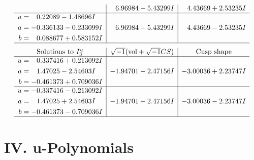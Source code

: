 \documentclass[1p]{elsarticle_modified}
\theoremstyle{definition}
\newcommand{\I}{\sqrt{-1}}
\begin{document}
$$\begin{array}{c|c|c}
 & \phantom{-}6.96984 - 5.43299 I & \phantom{-}4.43669 + 2.53235 I \\ \hline\begin{aligned}
u &= \phantom{-}0.22089 - 1.48696 I \\
a &= -0.336133 - 0.233099 I \\
b &= \phantom{-}0.088677 + 0.583152 I\end{aligned}
 & \phantom{-}6.96984 + 5.43299 I & \phantom{-}4.43669 - 2.53235 I\\
 \hline 
 \end{array}$$\newpage$$\begin{array}{c|c|c}  
\text{Solutions to }I^u_{3}& \I (\text{vol} + \sqrt{-1}CS) & \text{Cusp shape}\\
 \hline 
\begin{aligned}
u &= -0.337416 + 0.213092 I \\
a &= \phantom{-}1.47025 - 2.54603 I \\
b &= -0.461373 + 0.709036 I\end{aligned}
 & -1.94701 - 2.47156 I & -3.00036 + 2.23747 I \\ \hline\begin{aligned}
u &= -0.337416 - 0.213092 I \\
a &= \phantom{-}1.47025 + 2.54603 I \\
b &= -0.461373 - 0.709036 I\end{aligned}
 & -1.94701 + 2.47156 I & -3.00036 - 2.23747 I\\
 \hline 
 \end{array}$$\newpage
\newpage\renewcommand{\arraystretch}{1}
\centering \section*{ IV. u-Polynomials}
\end{document}
